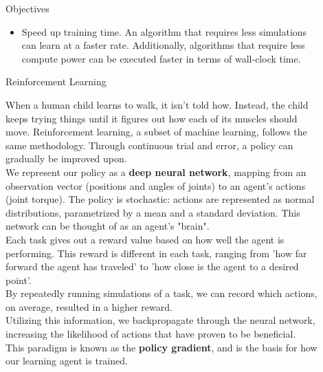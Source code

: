 \documentclass[final]{beamer}
\newlength{\sepwid}
\newlength{\onecolwid}
\newlength{\twocolwid}
\begin{document}
\begin{frame}[t]
\begin{columns}[t]
\begin{column}{\onecolwid}
\begin{alertblock}{Objectives}
\begin{itemize}
    \item Speed up training time. An algorithm that requires less simulations can learn at a faster rate. Additionally, algorithms that require less compute power can be executed faster in terms of wall-clock time.
    
    \end{itemize}

\end{alertblock}

\begin{block}{Reinforcement Learning}

When a human child learns to walk, it isn't told how. Instead, the child keeps trying things until it figures out how each of its muscles should move. Reinforcement learning, a subset of machine learning, follows the same methodology. Through continuous trial and error, a policy can gradually be improved upon.
\\[12pt]
We represent our policy as a \textbf{deep neural network}, mapping from an observation vector (positions and angles of joints) to an agent's actions (joint torque). The policy is stochastic: actions are represented as normal distributions, parametrized by a mean and a standard deviation. This network can be thought of as an agent's "brain".
\\[12pt]
Each task gives out a reward value based on how well the agent is performing. This reward is different in each task, ranging from 'how far forward the agent has traveled' to 'how close is the agent to a desired point'.
\\[12pt]
By repeatedly running simulations of a task, we can record which actions, on average, resulted in a higher reward.
\\[12pt]
Utilizing this information, we backpropagate through the neural network, increasing the likelihood of actions that have proven to be beneficial.
\\[12pt]
This paradigm is known as the \textbf{policy gradient}, and is the basis for how our learning agent is trained.


\end{block}

\end{column} %

\begin{column}{\sepwid}\end{column} %

\begin{column}{\twocolwid} %





\end{column}
\end{columns}
\end{frame}
\end{document}
